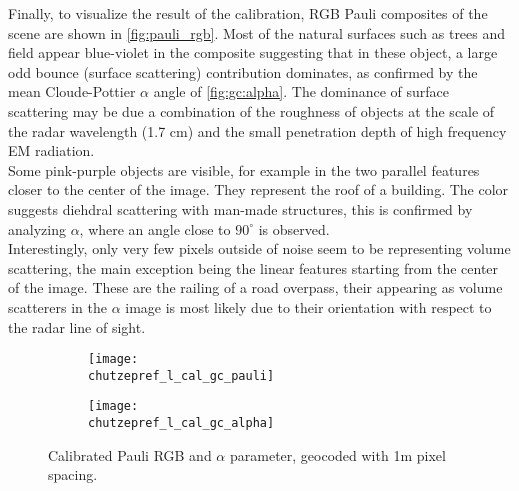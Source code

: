 Finally, to visualize the result of the calibration, RGB Pauli composites of the scene are shown in \autoref{fig:pauli_rgb}. Most of the natural surfaces such as trees and field appear blue-violet in the composite suggesting that in these object, a large odd bounce (surface scattering) contribution dominates, as confirmed by the mean Cloude-Pottier $\alpha$ angle of \autoref{fig:gc:alpha}. The dominance of surface scattering may be due a combination of the roughness of objects at the scale of the radar wavelength (1.7 cm) and the small penetration depth of high frequency EM radiation.\\ Some pink-purple objects are visible, for example in the two parallel features closer to the center of the image. They represent the roof of a building. The color suggests diehdral scattering with man-made structures, this is confirmed by analyzing $\alpha$, where an angle close to $90^\circ$ is observed.\\ 
Interestingly, only very few pixels outside of noise seem to be representing volume scattering, the main exception being the linear features starting from the center of the image. These are the railing of a road overpass, their appearing as volume scatterers in the $\alpha$ image is most likely due to their orientation with respect to the radar line of sight.

\begin{figure}[ht]
	\begin{subfigure}[t]{\columnwidth}
		\texttt{[image: \\chutzepref\_l\_cal\_gc\_pauli]}
		\label{fig:gc:pauli_rgb}
	\end{subfigure}
	\begin{subfigure}[t]{\columnwidth}
		\texttt{[image: \\chutzepref\_l\_cal\_gc\_alpha]}
		\label{fig:gc:alpha}
	\end{subfigure}
	\caption{Calibrated Pauli RGB and $\alpha$ parameter, geocoded with 1m pixel spacing.}
	\label{fig:gc}
\end{figure}


